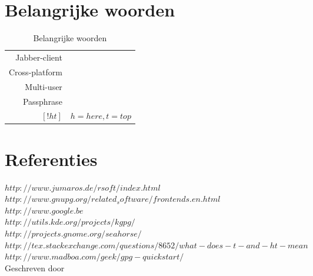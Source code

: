 \documentclass[12pt]{article}
\begin{document}
		\section{Belangrijke woorden}\label{Belangrijke woorden}
			\begin{table}[!ht]
				\begin{center}
					\begin{tabular}{r|l}
						Jabber-client		&	\\
						Cross-platform		&	\\
						Multi-user			&	\\
						Passphrase			&	\\
						$[!ht]$				&	$h=here, t=top$\\
					\end{tabular}
				\end{center}
				\caption{Belangrijke woorden}
			\end{table}

		\newpage
		\section{Referenties}\label{Referenties}
			$http://www.jumaros.de/rsoft/index.html$ \\
			$http://www.gnupg.org/related_software/frontends.en.html$ \\
			$http://www.google.be$\\
			$http://utils.kde.org/projects/kgpg/$\\
			$http://projects.gnome.org/seahorse/$\\
			$http://tex.stackexchange.com/questions/8652/what-does-t-and-ht-mean$\\
			$http://www.madboa.com/geek/gpg-quickstart/$\\
					
	Geschreven door ~\cite{Chari01}
	{}
	
\end{document}

